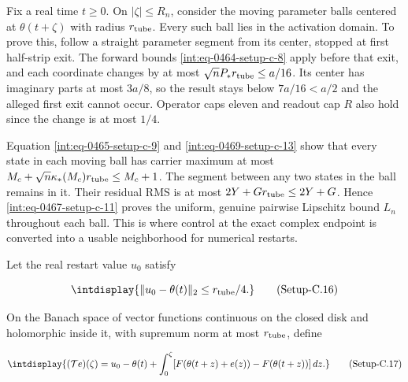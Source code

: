 
Fix a real time \(t\ge0\). On \( |\zeta|\le R_n\), consider the moving parameter balls centered at \(\theta(t+\zeta)\) with radius \(r_{\rm tube}\). Every such ball lies in the activation domain. To prove this, follow a straight parameter segment from its center, stopped at first half-strip exit. The forward bounds \hyperref[int:eq-setup-c-8]{\eqref{int:eq-0464-setup-c-8}} apply before that exit, and each coordinate changes by at most \(\sqrt nP_*r_{\rm tube}\le a/16\). Its center has imaginary parts at most \(3a/8\), so the result stays below \(7a/16<a/2\) and the alleged first exit cannot occur. Operator caps eleven and readout cap \(R\) also hold since the change is at most \(1/4\).



Equation \hyperref[int:eq-setup-c-9]{\eqref{int:eq-0465-setup-c-9}} and \hyperref[int:eq-setup-c-13]{\eqref{int:eq-0469-setup-c-13}} show that every state in each moving ball has carrier maximum at most \(M_c+\sqrt n\kappa_*(M_c)r_{\rm tube}\le M_c+1\). The segment between any two states in the ball remains in it. Their residual RMS is at most \(2Y+Gr_{\rm tube}\le2Y+G\). Hence \hyperref[int:eq-setup-c-11]{\eqref{int:eq-0467-setup-c-11}} proves the uniform, genuine pairwise Lipschitz bound \(L_n\) throughout each ball. This is where control at the exact complex endpoint is converted into a usable neighborhood for numerical restarts.



Let the real restart value \(u_0\) satisfy


\label{int:eq-setup-c-16}
\begingroup\renewcommand{\theHequation}{intdisplay.939}
\begin{equation}
\intdisplay{
\|u_0-\theta(t)\|_2\le r_{\rm tube}/4.
}
\tag{Setup-C.16}
\label{int:eq-0472-setup-c-16}
\end{equation}
\endgroup


On the Banach space of vector functions continuous on the closed disk and holomorphic inside it, with supremum norm at most \(r_{\rm tube}\), define


\label{int:eq-setup-c-17}
\begingroup\renewcommand{\theHequation}{intdisplay.940}
\begin{equation}
\intdisplay{
(\mathcal Te)(\zeta)=u_0-\theta(t)
 +\int_0^\zeta
 [F(\theta(t+z)+e(z))-F(\theta(t+z))]\,dz.
}
\tag{Setup-C.17}
\label{int:eq-0473-setup-c-17}
\end{equation}
\endgroup

